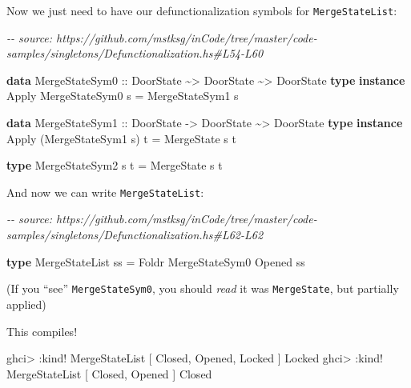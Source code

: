 \documentclass[]{article}
\newenvironment{Shaded}{}{}
\newcommand{\CommentTok}[1]{\textcolor[rgb]{0.38,0.63,0.69}{\textit{#1}}}
\newcommand{\DataTypeTok}[1]{\textcolor[rgb]{0.56,0.13,0.00}{#1}}
\newcommand{\KeywordTok}[1]{\textcolor[rgb]{0.00,0.44,0.13}{\textbf{#1}}}
\newcommand{\NormalTok}[1]{#1}
\newcommand{\OperatorTok}[1]{\textcolor[rgb]{0.40,0.40,0.40}{#1}}
\newcommand{\OtherTok}[1]{\textcolor[rgb]{0.00,0.44,0.13}{#1}}
\begin{document}
Now we just need to have our defunctionalization symbols for
\texttt{MergeStateList}:

\begin{Shaded}
\begin{Highlighting}[]
\CommentTok{{-}{-} source: https://github.com/mstksg/inCode/tree/master/code{-}samples/singletons/Defunctionalization.hs\#L54{-}L60}

\KeywordTok{data} \DataTypeTok{MergeStateSym0}\OtherTok{ ::} \DataTypeTok{DoorState} \OperatorTok{\textasciitilde{}\textgreater{}} \DataTypeTok{DoorState} \OperatorTok{\textasciitilde{}\textgreater{}} \DataTypeTok{DoorState}
\KeywordTok{type} \KeywordTok{instance} \DataTypeTok{Apply} \DataTypeTok{MergeStateSym0}\NormalTok{ s }\OtherTok{=} \DataTypeTok{MergeStateSym1}\NormalTok{ s}

\KeywordTok{data} \DataTypeTok{MergeStateSym1}\OtherTok{ ::} \DataTypeTok{DoorState} \OtherTok{{-}\textgreater{}} \DataTypeTok{DoorState} \OperatorTok{\textasciitilde{}\textgreater{}} \DataTypeTok{DoorState}
\KeywordTok{type} \KeywordTok{instance} \DataTypeTok{Apply}\NormalTok{ (}\DataTypeTok{MergeStateSym1}\NormalTok{ s) t }\OtherTok{=} \DataTypeTok{MergeState}\NormalTok{ s t}

\KeywordTok{type} \DataTypeTok{MergeStateSym2}\NormalTok{ s t }\OtherTok{=} \DataTypeTok{MergeState}\NormalTok{ s t}
\end{Highlighting}
\end{Shaded}

And now we can write \texttt{MergeStateList}:

\begin{Shaded}
\begin{Highlighting}[]
\CommentTok{{-}{-} source: https://github.com/mstksg/inCode/tree/master/code{-}samples/singletons/Defunctionalization.hs\#L62{-}L62}

\KeywordTok{type} \DataTypeTok{MergeStateList}\NormalTok{ ss }\OtherTok{=} \DataTypeTok{Foldr} \DataTypeTok{MergeStateSym0} \DataTypeTok{\textquotesingle{}Opened}\NormalTok{ ss}
\end{Highlighting}
\end{Shaded}

(If you ``see'' \texttt{MergeStateSym0}, you should \emph{read} it was
\texttt{MergeState}, but partially applied)

This compiles!

\begin{Shaded}
\begin{Highlighting}[]
\NormalTok{ghci}\OperatorTok{\textgreater{}} \OperatorTok{:}\NormalTok{kind}\OperatorTok{!} \DataTypeTok{MergeStateList}\NormalTok{ \textquotesingle{}[ }\DataTypeTok{\textquotesingle{}Closed}\NormalTok{, }\DataTypeTok{\textquotesingle{}Opened}\NormalTok{, }\DataTypeTok{\textquotesingle{}Locked}\NormalTok{ ]}
\DataTypeTok{\textquotesingle{}Locked}
\NormalTok{ghci}\OperatorTok{\textgreater{}} \OperatorTok{:}\NormalTok{kind}\OperatorTok{!} \DataTypeTok{MergeStateList}\NormalTok{ \textquotesingle{}[ }\DataTypeTok{\textquotesingle{}Closed}\NormalTok{, }\DataTypeTok{\textquotesingle{}Opened}\NormalTok{ ]}
\DataTypeTok{\textquotesingle{}Closed}
\end{Highlighting}
\end{Shaded}
\end{document}
